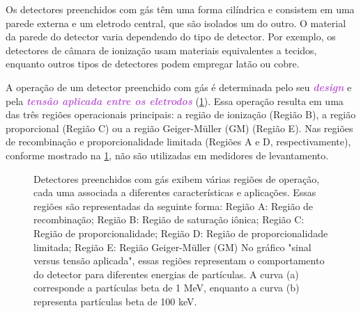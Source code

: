 \documentclass[11pt,a4paper]{article}
\newcounter{exemplo}
\begin{document}
	Os detectores preenchidos com gás têm uma forma cilíndrica e consistem em uma parede externa e um eletrodo central, que são isolados um do outro. O material da parede do detector varia dependendo do tipo de detector. Por exemplo, os detectores de câmara de ionização usam materiais equivalentes a tecidos, enquanto outros tipos de detectores podem empregar latão ou cobre.

	A operação de um detector preenchido com gás é determinada pelo seu \textcolor{MediumOrchid}{\textit{\textbf{design}}} e pela \textcolor{MediumOrchid}{\textit{\textbf{tensão aplicada entre os eletrodos}}} (\ref{fig:regiaoDetecGas}). Essa operação resulta em uma das três regiões operacionais principais: a região de ionização (Região B), a região proporcional (Região C) ou a região Geiger-Müller (GM) (Região E). Nas regiões de recombinação e proporcionalidade limitada (Regiões A e D, respectivamente), conforme mostrado na \ref{fig:regiaoDetecGas}, não são utilizadas em medidores de levantamento.

	\begin{figure}[h]
		\centering
		\caption{Detectores preenchidos com gás exibem várias regiões de operação, cada uma associada a diferentes características e aplicações. Essas regiões são representadas da seguinte forma: Região A: Região de recombinação; Região B: Região de saturação iônica; Região C: Região de proporcionalidade; Região D: Região de proporcionalidade limitada; Região E: Região Geiger-Müller (GM) No gráfico "sinal versus tensão aplicada", essas regiões representam o comportamento do detector para diferentes energias de partículas. A curva (a) corresponde a partículas beta de 1 MeV, enquanto a curva (b) representa partículas beta de 100 keV.}
		\label{fig:regiaoDetecGas}
	\end{figure}
\end{document}
